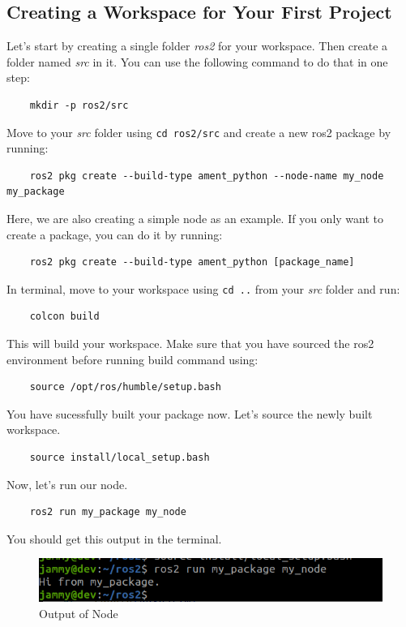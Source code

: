\documentclass{article}
\begin{document}
\subsection{Creating a Workspace for Your First Project}
Let's start by creating a single folder \textit{ros2} for your workspace. Then create a folder named \textit{src} in it.
You can use the following command to do that in one step:
\begin{verbatim}
    mkdir -p ros2/src
\end{verbatim}
Move to your \textit{src} folder using \texttt{cd ros2/src} and create a new ros2 package by running:
\begin{verbatim}
    ros2 pkg create --build-type ament_python --node-name my_node my_package 
\end{verbatim}
Here, we are also creating a simple node as an example. If you only want to create a package, you can do it by running:
\begin{verbatim}
    ros2 pkg create --build-type ament_python [package_name]
\end{verbatim}
In terminal, move to your workspace using \texttt{cd ..} from your \textit{src} folder and run:
\begin{verbatim}
    colcon build
\end{verbatim}
This will build your workspace. Make sure that you have sourced the ros2 environment before running build command using:
 \begin{verbatim}
    source /opt/ros/humble/setup.bash
\end{verbatim}
You have sucessfully built your package now. Let's source the newly built workspace.
\begin{verbatim}
    source install/local_setup.bash
\end{verbatim}
Now, let's run our node.
\begin{verbatim}
    ros2 run my_package my_node
\end{verbatim}
You should get this output in the terminal.
\begin{figure}[h]
    \includegraphics[width=12cm]{./data/images/pic0.png}
    \centering
    \caption{Output of Node}
\end{figure}    
\end{document}
